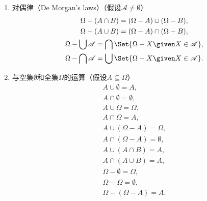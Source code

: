 \begin{property}
\begin{enumerate}
\item 对偶律（{\rm De Morgan's laws}）（假设\(\mathscr{A}\neq\emptyset\)）
\begin{gather}
	\Omega - (A \cap B)
	= (\Omega - A) \cup (\Omega - B), \label{equation:集合论.集合代数公式4-1} \\
	\Omega - (A \cup B)
	= (\Omega - A) \cap (\Omega - B), \label{equation:集合论.集合代数公式4-2} \\
	\Omega - \bigcup\mathscr{A}
	= \bigcap\Set{\Omega - X \given X\in\mathscr{A}}, \label{equation:集合论.集合代数公式4-3} \\
	\Omega - \bigcap\mathscr{A}
	= \bigcup\Set{\Omega - X \given X\in\mathscr{A}}. \label{equation:集合论.集合代数公式4-4}
\end{gather}

\item 与空集\(\emptyset\)和全集\(\Omega\)的运算（假设\(A \subseteq \Omega\)）
\begin{gather}
	A \cup \emptyset = A, \label{equation:集合论.集合代数公式5-1} \\
	A \cap \emptyset = \emptyset, \label{equation:集合论.集合代数公式5-2} \\
	A \cup \Omega = \Omega, \label{equation:集合论.集合代数公式5-3} \\
	A \cap \Omega = A, \label{equation:集合论.集合代数公式5-4} \\
	A \cup (\Omega - A) = \Omega, \label{equation:集合论.集合代数公式5-5} \\
	A \cap (\Omega - A) = \emptyset, \label{equation:集合论.集合代数公式5-6} \\
	A \cup (A \cap B) = A, \\
	A \cap (A \cup B) = A, \\
	\Omega - \emptyset = \Omega, \\
	\Omega - \Omega = \emptyset, \\
	\Omega - (\Omega - A) = A.
\end{gather}


\end{enumerate}
\end{property}
